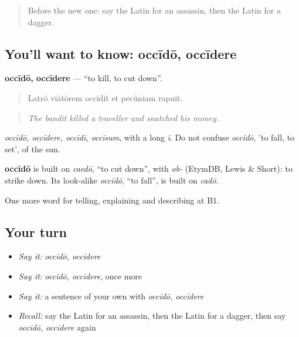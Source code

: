 \label{lesson:LA-C306-occido}



\begin{quote}
Before the new one: say the Latin for an assassin, then the Latin for a dagger.
\end{quote}

\subsection*{You'll want to know: occīdō, occīdere}
\textbf{occīdō, occīdere} — \textquotedblleft{}to kill, to cut down\textquotedblright{}.

\begin{quote}
Latrō viātōrem occīdit et pecūniam rapuit.
\end{quote}

\begin{quote}
\emph{The bandit killed a traveller and snatched his money.}
\end{quote}

\emph{occīdō, occīdere, occīdī, occīsum}, with a long \emph{ī}. Do not confuse \emph{occidō}, 'to fall, to set', of the sun.

\begin{cousinweb}
\textbf{occīdō} is built on \emph{caedō}, \textquotedblleft{}to cut down\textquotedblright{}, with \emph{ob-} (EtymDB, Lewis \& Short): to strike down. Its look-alike \emph{occidō}, \textquotedblleft{}to fall\textquotedblright{}, is built on \emph{cadō}.
\end{cousinweb}

\begin{grammarlens}[title={What you've built}]
One more word for telling, explaining and describing at B1.
\end{grammarlens}

\subsection*{Your turn}
\begin{itemize}
\raggedright
  \item \emph{Say it:} \emph{occīdō, occīdere}
  \item \emph{Say it:} \emph{occīdō, occīdere}, once more
  \item \emph{Say it:} a sentence of your own with \emph{occīdō, occīdere}
  \item \emph{Recall:} say the Latin for an assassin, then the Latin for a dagger, then say \emph{occīdō, occīdere} again
\end{itemize}

